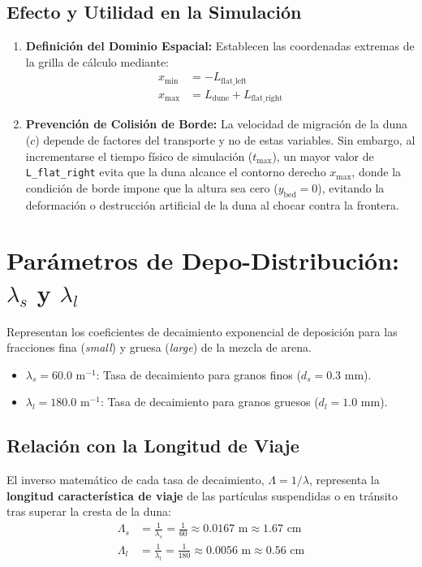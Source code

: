 \documentclass[11pt,a4paper]{article}
\begin{document}
\subsection{Efecto y Utilidad en la Simulación}
\begin{enumerate}
    \item \textbf{Definición del Dominio Espacial:} Establecen las coordenadas extremas de la grilla de cálculo mediante:
    \begin{align}
        x_{\text{min}} &= -L_{\text{flat\_left}} \\
        x_{\text{max}} &= L_{\text{dune}} + L_{\text{flat\_right}}
    \end{align}
    \item \textbf{Prevención de Colisión de Borde:} La velocidad de migración de la duna ($c$) depende de factores del transporte y no de estas variables. Sin embargo, al incrementarse el tiempo físico de simulación ($t_{\text{max}}$), un mayor valor de \texttt{L\_flat\_right} evita que la duna alcance el contorno derecho $x_{\text{max}}$, donde la condición de borde impone que la altura sea cero ($y_{\text{bed}} = 0$), evitando la deformación o destrucción artificial de la duna al chocar contra la frontera.
\end{enumerate}

\section{Parámetros de Depo-Distribución: $\lambda_s$ y $\lambda_l$}
Representan los coeficientes de decaimiento exponencial de deposición para las fracciones fina (\textit{small}) y gruesa (\textit{large}) de la mezcla de arena.

\begin{itemize}
    \item $\lambda_s = 60.0 \text{ m}^{-1}$: Tasa de decaimiento para granos finos ($d_s = 0.3 \text{ mm}$).
    \item $\lambda_l = 180.0 \text{ m}^{-1}$: Tasa de decaimiento para granos gruesos ($d_l = 1.0 \text{ mm}$).
\end{itemize}

\subsection{Relación con la Longitud de Viaje}
El inverso matemático de cada tasa de decaimiento, $\Lambda = 1/\lambda$, representa la \textbf{longitud característica de viaje} de las partículas suspendidas o en tránsito tras superar la cresta de la duna:
\begin{align}
    \Lambda_s &= \frac{1}{\lambda_s} = \frac{1}{60} \approx 0.0167 \text{ m} \approx 1.67 \text{ cm} \\
    \Lambda_l &= \frac{1}{\lambda_l} = \frac{1}{180} \approx 0.0056 \text{ m} \approx 0.56 \text{ cm}
\end{align}
\end{document}

